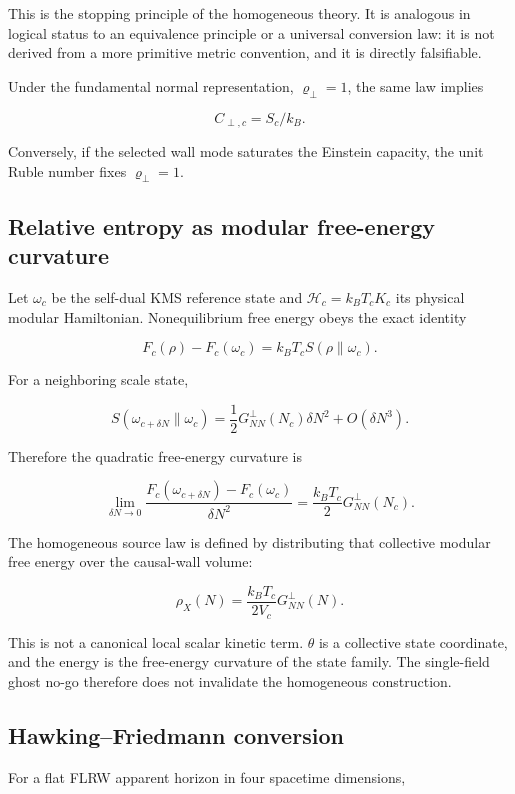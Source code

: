 \documentclass[
  11pt,
  letterpaper,
]{article}
\begin{document}
This is the stopping principle of the homogeneous theory. It is
analogous in logical status to an equivalence principle or a universal
conversion law: it is not derived from a more primitive metric
convention, and it is directly falsifiable.

Under the fundamental normal representation, \(\varrho_\perp=1\), the
same law implies

\[
C_{\perp,c}=S_c/k_B.
\]

Conversely, if the selected wall mode saturates the Einstein capacity,
the unit Ruble number fixes \(\varrho_\perp=1\).

\subsection{Relative entropy as modular free-energy
curvature}\label{relative-entropy-as-modular-free-energy-curvature}

Let \(\omega_c\) be the self-dual KMS reference state and
\(\mathcal H_c=k_BT_cK_c\) its physical modular Hamiltonian.
Nonequilibrium free energy obeys the exact identity

\[
F_c(\rho)-F_c(\omega_c)
=k_BT_cS(\rho\|\omega_c).
\]

For a neighboring scale state,

\[
S(\omega_{c+\delta N}\|\omega_c)
=\frac12G^{\perp}_{NN}(N_c)\delta N^2+O(\delta N^3).
\]

Therefore the quadratic free-energy curvature is

\[
\lim_{\delta N\to0}
\frac{F_c(\omega_{c+\delta N})-F_c(\omega_c)}{\delta N^2}
=\frac{k_BT_c}{2}G^{\perp}_{NN}(N_c).
\]

The homogeneous source law is defined by distributing that collective
modular free energy over the causal-wall volume:

\[
\boxed{
\rho_X(N)=\frac{k_BT_c}{2V_c}G^{\perp}_{NN}(N).
}
\]

This is not a canonical local scalar kinetic term. \(\theta\) is a
collective state coordinate, and the energy is the free-energy curvature
of the state family. The single-field ghost no-go therefore does not
invalidate the homogeneous construction.

\subsection{Hawking--Friedmann
conversion}\label{hawkingfriedmann-conversion}

For a flat FLRW apparent horizon in four spacetime dimensions,
\end{document}

